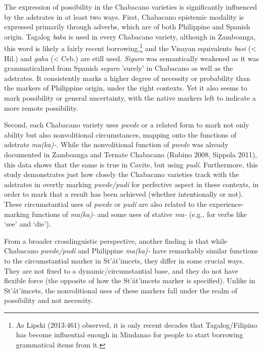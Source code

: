 \begin{styleStandard}
The expression of possibility in the Chabacano varieties is significantly influenced by the adstrates in at least two ways. First, Chabacano epistemic modality is expressed primarily through adverbs, which are of both Philippine and Spanish origin. Tagalog \textit{baka }is used in every Chabacano variety, although in Zamboanga, this word is likely a fairly recent borrowing,\footnote{As Lipski (2013:461) observed, it is only recent decades that Tagalog/Filipino has become influential enough in Mindanao for people to start borrowing grammatical items from it.} and the Visayan equivalents \textit{basi }({\textless} Hil.) and \textit{gaha }({\textless} Ceb.) are still used. \textit{Siguro} was semantically weakened as it was grammaticalized from Spanish \textit{seguro }{}'surely' in Chabacano as well as the adstrates. It consistently marks a higher degree of necessity or probability than the markers of Philippine origin, under the right contexts. Yet it also seems to mark possibility or general uncertainty, with the native markers left to indicate a more remote possibility. 
\end{styleStandard}

\begin{styleStandard}
Second, each Chabacano variety uses \textit{pwede} or a related form to mark not only ability but also nonvolitional circumstances, mapping onto the functions of adstrate \textit{ma(ka)-}. While the nonvolitional function of \textit{pwede} was already documented in Zamboanga and Ternate Chabacano (Rubino 2008, Sippola 2011), this data shows that the same is true in Cavite, but using \textit{pudí}. Furthermore, this study demonstrates just how closely the Chabacano varieties track with the adstrates in overtly marking \textit{pwede/pudí} for perfective aspect in these contexts, in order to mark that a result has been achieved (whether intentionally or not). These circumstantial uses of \textit{pwede }or \textit{pudí} are also related to the experience-marking functions of \textit{ma(ka)-} and some uses of stative \textit{ma-} (e.g., for verbs like ‘see’ and ‘die’). 
\end{styleStandard}

\begin{styleStandard}
From a broader crosslinguistic perspective, another finding is that while Chabacano \textit{pwede/pudí} and Philippine \textit{ma(ka)-} have remarkably similar functions to the circumstantial marker in St’át’imcets, they differ in some crucial ways. They are not fixed to a dynamic/circumstantial base, and they do not have flexible force (the opposite of how the St’át’imcets marker is specified). Unlike in St’át’imcets, the nonvolitional uses of these markers fall under the realm of possibility and not necessity.
\end{styleStandard}

